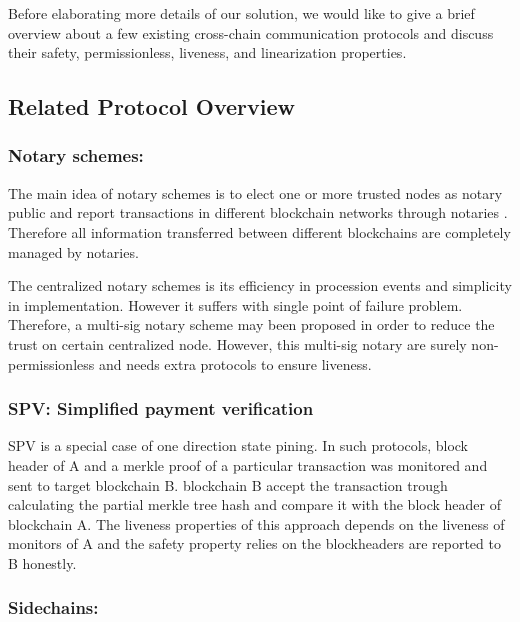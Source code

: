 \documentclass[pageno]{jpaper}
\begin{document}
Before elaborating more details of our solution, we would like to give a brief overview about a few existing cross-chain communication protocols and discuss their safety, permissionless, liveness, and linearization properties.


\subsection{Related Protocol Overview}
\subsubsection{Notary schemes:}

The main idea of notary schemes is to elect one or more trusted nodes as notary public and report transactions in different blockchain networks through notaries \cite{qin2018overview}. Therefore all information transferred between different blockchains are completely managed by notaries.

The centralized notary schemes is its efficiency in procession events and simplicity in implementation. However it suffers with single point of failure problem. Therefore, a multi-sig notary scheme may been proposed in order to reduce the trust on certain centralized node. However, this multi-sig notary are surely non-permissionless and needs extra protocols to ensure liveness.
\\
\subsubsection{SPV: Simplified payment verification}

    SPV is a special case of one direction state pining. In such protocols, block header of A and a merkle proof of a particular transaction was monitored and sent to target blockchain B. blockchain B accept the transaction trough calculating the partial merkle tree hash and compare it with the block header of blockchain A. The liveness properties of this approach depends on the liveness of monitors of A and the safety property relies on the blockheaders are reported to B honestly. 
\\
\subsubsection{Sidechains:}
\end{document}
